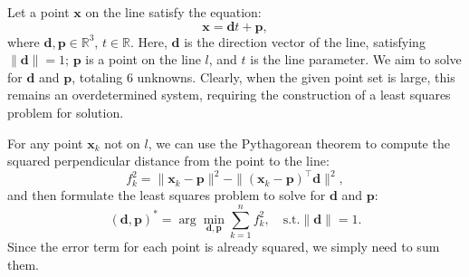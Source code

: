Let a point $\mathbf{x}$ on the line satisfy the equation:
\begin{equation}\label{key}
	\mathbf{x} = \mathbf{d} t + \mathbf{p},
\end{equation}
where $\mathbf{d}, \mathbf{p} \in \mathbb{R}^3$, $t \in \mathbb{R}$. Here, $\mathbf{d}$ is the direction vector of the line, satisfying $\|\mathbf{d}\| = 1$; $\mathbf{p}$ is a point on the line $l$, and $t$ is the line parameter. We aim to solve for $\mathbf{d}$ and $\mathbf{p}$, totaling 6 unknowns. Clearly, when the given point set is large, this remains an overdetermined system, requiring the construction of a least squares problem for solution.

For any point $\mathbf{x}_k$ not on $l$, we can use the Pythagorean theorem to compute the squared perpendicular distance from the point to the line:
\begin{equation}\label{key}
	f^2_k = \| \mathbf{x}_k - \mathbf{p}\|^2 - \| (\mathbf{x}_k-\mathbf{p})^\top \mathbf{d} \|^2 ,
\end{equation}
and then formulate the least squares problem to solve for $\mathbf{d}$ and $\mathbf{p}$:
\begin{equation}\label{key}
	(\mathbf{d},\mathbf{p})^* = \arg \min_{\mathbf{d}, \mathbf{p}} \sum_{k=1}^{n} f_k^2, \quad \text{s.t.} \|\mathbf{d}\|= 1.
\end{equation}
Since the error term for each point is already squared, we simply need to sum them.

